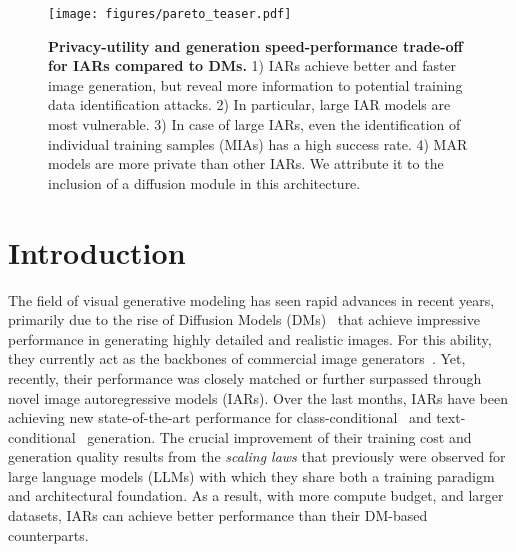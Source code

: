 

\begin{figure*}[h!]
    \centering
    \texttt{[image: figures/pareto\_teaser.pdf]}
    \caption{\textbf{Privacy-utility and generation speed-performance trade-off for IARs compared to DMs.} 1) IARs achieve better and faster image generation, but reveal more information to potential training data identification attacks.
2) In particular, large IAR models are most vulnerable.
3) In case of large IARs, even the identification of individual training samples (MIAs) has a high success rate.
4) MAR models are more private than other IARs. We attribute it to the inclusion of a diffusion module in this architecture.
}
    \vspace{-10pt}
    \label{fig:pareto}

\end{figure*}

\section{Introduction}
\label{sec:introduction}

The field of visual generative modeling has seen rapid advances in recent years, primarily due to the rise of Diffusion Models (DMs)~\citep{sohl2015deep} that achieve impressive performance in generating highly detailed and realistic images.
For this ability, they currently act as the backbones of commercial image generators~\citep{rombach2022high,midjourney,saharia2022photorealistic}.
Yet, recently, their performance was closely matched or further surpassed through novel image autoregressive models (IARs).
Over the last months, IARs have been achieving new state-of-the-art performance for class-conditional~\citep{var_tian2024visualautoregressivemodelingscalable,rar_yu2024randomizedautoregressivevisualgeneration,mar_li2024autoregressiveimagegenerationvector}
and text-conditional~\citep{han2024infinityscalingbitwiseautoregressive,tang2024hartefficientvisualgeneration,fan2024fluidscalingautoregressivetexttoimage} generation.
The crucial improvement of their training cost and generation quality results from the \textit{scaling laws} that previously were observed for large language models (LLMs) \citep{kaplan2020scaling} with which they share both a training paradigm and architectural foundation.
As a result, with more compute budget, and larger datasets, IARs can achieve better performance than their DM-based counterparts.



